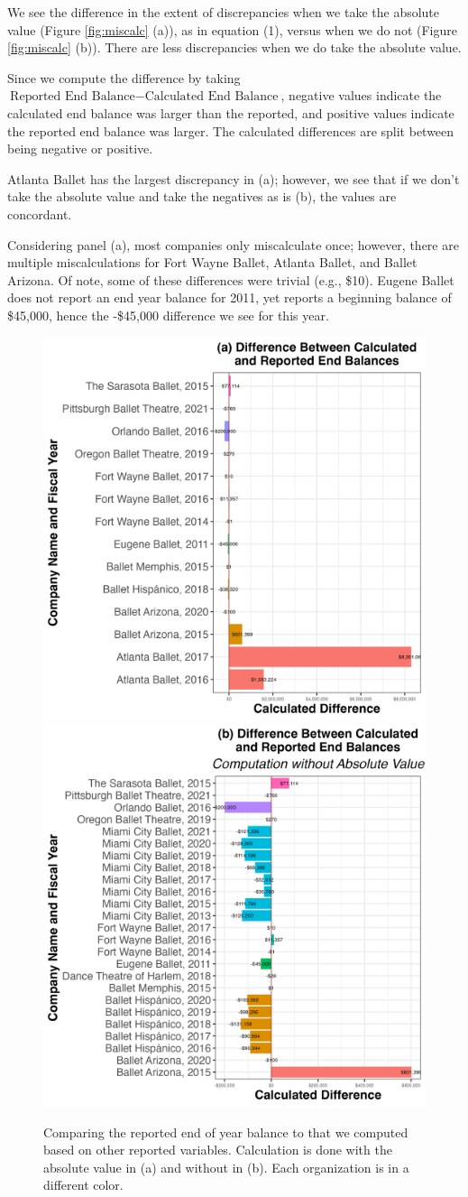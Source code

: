 \documentclass[Dance Data
Project,article,submit,moreauthors,pdftex]{mdpi}
\begin{document}
We see the difference in the extent of discrepancies when we take the
absolute value (Figure \ref{fig:miscalc} (a)), as in equation (1),
versus when we do not (Figure \ref{fig:miscalc} (b)). There are less
discrepancies when we do take the absolute value.

Since we compute the difference by taking
\(\text{Reported End Balance} - \text{Calculated End Balance}\),
negative values indicate the calculated end balance was larger than the
reported, and positive values indicate the reported end balance was
larger. The calculated differences are split between being negative or
positive.

Atlanta Ballet has the largest discrepancy in (a); however, we see that
if we don't take the absolute value and take the negatives as is (b),
the values are concordant.

Considering panel (a), most companies only miscalculate once; however,
there are multiple miscalculations for Fort Wayne Ballet, Atlanta
Ballet, and Ballet Arizona. Of note, some of these differences were
trivial (e.g., \$10). Eugene Ballet does not report an end year balance
for 2011, yet reports a beginning balance of \$45,000, hence the
-\$45,000 difference we see for this year.

\begin{figure}[H]
\includegraphics[width=0.5\linewidth,]{../images/diff_end_bal} \includegraphics[width=0.5\linewidth,]{../images/diff_end_bal_no_abs} \caption{\label{fig:miscalc}Comparing the reported end of year balance to that we computed based on other reported variables. Calculation is done with the absolute value in (a) and without in (b). Each organization is in a different color.}\label{fig:unnamed-chunk-4}
\end{figure}
\end{document}
